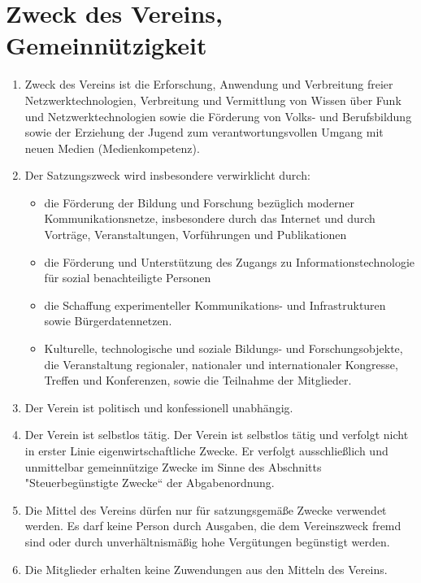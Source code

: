 \documentclass[12pt,a4paper,titlepage]{scrartcl}
\begin{document}
\section{Zweck des Vereins, Gemeinnützigkeit}
\begin{enumerate}
\item Zweck des Vereins ist die Erforschung, Anwendung und Verbreitung freier 
Netzwerktechnologien, Verbreitung und Vermittlung von Wissen über Funk und 
Netzwerktechnologien sowie die Förderung von Volks- und Berufsbildung sowie der Erziehung der Jugend zum verantwortungsvollen Umgang mit neuen Medien (Medienkompetenz).
\item Der Satzungszweck wird insbesondere verwirklicht durch:
\begin{itemize}
\item die Förderung der Bildung und Forschung bezüglich moderner Kommunikationsnetze, insbesondere durch das Internet und durch Vorträge, Veranstaltungen, Vorführungen und Publikationen
\item die Förderung und Unterstützung des Zugangs zu Informationstechnologie für sozial benachteiligte Personen
\item die Schaffung experimenteller Kommunikations- und Infrastrukturen sowie Bürgerdatennetzen.
\item Kulturelle, technologische und soziale Bildungs- und Forschungsobjekte, die Veranstaltung regionaler, nationaler und internationaler Kongresse, Treffen und Konferenzen, sowie die Teilnahme der Mitglieder.
\end{itemize}
\item Der Verein ist politisch und konfessionell unabhängig.
\item Der Verein ist selbstlos tätig. Der Verein ist selbstlos tätig und verfolgt nicht in erster Linie eigenwirtschaftliche Zwecke. Er verfolgt ausschließlich und unmittelbar gemeinnützige Zwecke im Sinne des Abschnitts "Steuerbegünstigte Zwecke“ der Abgabenordnung.
\item Die Mittel des Vereins dürfen nur für satzungsgemäße Zwecke verwendet werden. Es darf keine Person durch Ausgaben, die dem Vereinszweck fremd sind oder durch unverhältnismäßig hohe Vergütungen begünstigt werden.
\item Die Mitglieder erhalten keine Zuwendungen aus den Mitteln des Vereins.
\end{enumerate}
\end{document}
